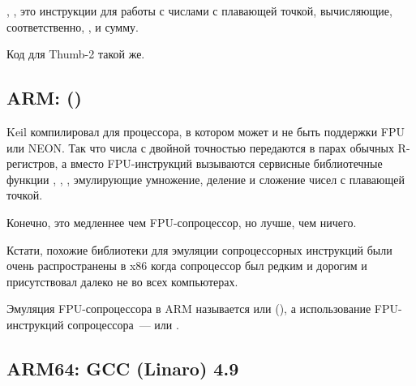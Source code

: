 ,  \AndENRU {}, это инструкции для работы с числами 
с плавающей точкой, вычисляющие, соответственно, ,  и сумму.

Код для Thumb-2 такой же.

\subsection{ARM: \OptimizingKeilVI (\ThumbMode)}



Keil компилировал для процессора, в котором может и не быть поддержки FPU или NEON.
Так что числа с двойной точностью передаются в парах обычных R-регистров,
а вместо FPU-инструкций вызываются сервисные библиотечные функции
, , , эмулирующие умножение, деление и сложение чисел с плавающей точкой.

Конечно, это медленнее чем FPU-сопроцессор, но лучше, чем ничего.

Кстати, похожие библиотеки для эмуляции сопроцессорных инструкций были очень распространены в x86 
когда сопроцессор был редким и дорогим и присутствовал далеко не во всех компьютерах.

Эмуляция FPU-сопроцессора в ARM называется  или  (),
а использование FPU-инструкций сопроцессора~---  или .

\iffalse
\myindex{Raspberry Pi}
Ядро Linux, например, для Raspberry Pi может поставляться в двух вариантах.

В случае \IT{soft float}, аргументы будут передаваться через R-регистры, 
а в случае \IT{hard float}, через D-регистры.


И это то, что помешает использовать, например, armhf-библиотеки
из armel-кода или наоборот, поэтому, весь код в дистрибутиве Linux должен быть скомпилирован
в соответствии с выбранным соглашением о вызовах.

\fi

\subsection{ARM64: \Optimizing GCC (Linaro) 4.9}

